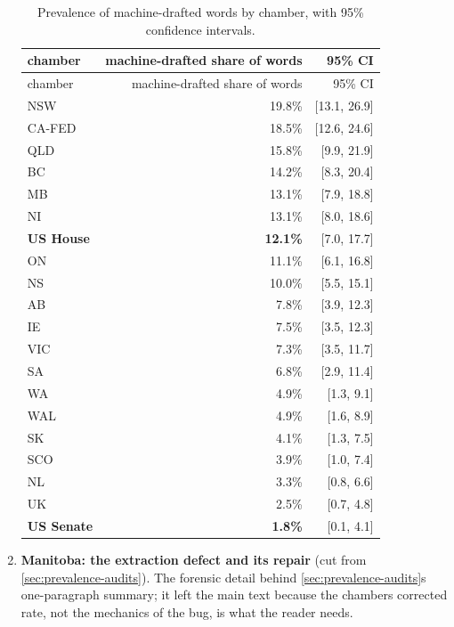 \begin{enumerate}
  \begingroup\small
\begin{longtable}[]{@{}lrr@{}}
\caption{Prevalence of machine-drafted words by chamber, with 95\% confidence intervals.}\label{tab:prevalence}\\
  \toprule\noalign{}
  chamber & machine-drafted share of words & 95\% CI \\
  \midrule\noalign{}
\endfirsthead
  \toprule\noalign{}
  chamber & machine-drafted share of words & 95\% CI \\
  \midrule\noalign{}
\endhead
  \bottomrule\noalign{}
  \endlastfoot
  NSW & 19.8\% & {[}13.1, 26.9{]} \\
  CA-FED & 18.5\% & {[}12.6, 24.6{]} \\
  QLD & 15.8\% & {[}9.9, 21.9{]} \\
  BC & 14.2\% & {[}8.3, 20.4{]} \\
  MB & 13.1\% & {[}7.9, 18.8{]} \\
  NI & 13.1\% & {[}8.0, 18.6{]} \\
  \textbf{US House} & \textbf{12.1\%} & {[}7.0, 17.7{]} \\
  ON & 11.1\% & {[}6.1, 16.8{]} \\
  NS & 10.0\% & {[}5.5, 15.1{]} \\
  AB & 7.8\% & {[}3.9, 12.3{]} \\
  IE & 7.5\% & {[}3.5, 12.3{]} \\
  VIC & 7.3\% & {[}3.5, 11.7{]} \\
  SA & 6.8\% & {[}2.9, 11.4{]} \\
  WA & 4.9\% & {[}1.3, 9.1{]} \\
  WAL & 4.9\% & {[}1.6, 8.9{]} \\
  SK & 4.1\% & {[}1.3, 7.5{]} \\
  SCO & 3.9\% & {[}1.0, 7.4{]} \\
  NL & 3.3\% & {[}0.8, 6.6{]} \\
  UK & 2.5\% & {[}0.7, 4.8{]} \\
  \textbf{US Senate} & \textbf{1.8\%} & {[}0.1, 4.1{]} \\
  \end{longtable}
\endgroup
\item
  \textbf{Manitoba: the extraction defect and its repair} (cut from \cref{sec:prevalence-audits}). The
  forensic detail behind \cref{sec:prevalence-audits}\textquotesingle s one-paragraph summary; it left the main text
  because the chamber\textquotesingle s corrected rate, not the mechanics of the bug, is what
  the reader needs.


\end{enumerate}
